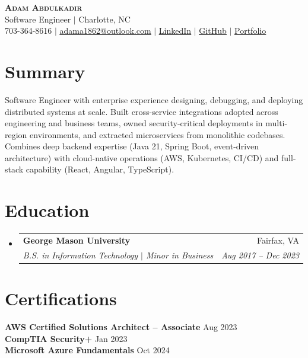 \documentclass[letterpaper,12pt]{article}
\makeatletter
\newcommand{\resumeSubheading}[4]{
  \needspace{6\baselineskip}%
  \vspace{-2pt}\item
    \begin{tabular*}{0.97\textwidth}[t]{l@{\extracolsep{\fill}}r}
      \textbf{#1} & #2 \\
      \textit{\small#3} & \textit{\small #4} \\
    \end{tabular*}\vspace{-7pt}
}
\newcommand{\resumeSubHeadingListStart}{\begin{itemize}[leftmargin=0.15in, label={}]}
\newcommand{\resumeSubHeadingListEnd}{\end{itemize}}
\makeatother
\begin{document}
\begin{center}
    \textbf{\Huge \scshape Adam Abdulkadir} \\ \vspace{4pt}
    \small Software Engineer $|$ Charlotte, NC \\ \vspace{4pt}
    \small 703-364-8616 $|$
    \href{mailto:adama1862@outlook.com}{\underline{adama1862@outlook.com}} $|$
    \href{https://linkedin.com/in/adam-abdulkadir}{\underline{LinkedIn}} $|$
    \href{https://github.com/aabdulk862}{\underline{GitHub}} $|$
    \href{https://adam-abdul.com/}{\underline{Portfolio}}
\end{center}

\section{Summary}
\small{Software Engineer with enterprise experience designing, debugging, and deploying distributed systems at scale. Built cross-service integrations adopted across engineering and business teams, owned security-critical deployments in multi-region environments, and extracted microservices from monolithic codebases. Combines deep backend expertise (Java 21, Spring Boot, event-driven architecture) with cloud-native operations (AWS, Kubernetes, CI/CD) and full-stack capability (React, Angular, TypeScript).}

\section{Education}
  \resumeSubHeadingListStart
    \resumeSubheading
      {George Mason University}{Fairfax, VA}
      {B.S. in Information Technology \textnormal{$|$} Minor in Business}{Aug 2017 -- Dec 2023}
  \resumeSubHeadingListEnd

\section{Certifications}
\begin{itemize}[leftmargin=0.15in, label={}]
    \small{\item{
        \textbf{AWS Certified Solutions Architect -- Associate} \hfill Aug 2023 \\
        \textbf{CompTIA Security+} \hfill Jan 2023 \\
        \textbf{Microsoft Azure Fundamentals} \hfill Oct 2024
    }}
\end{itemize}
\end{document}
